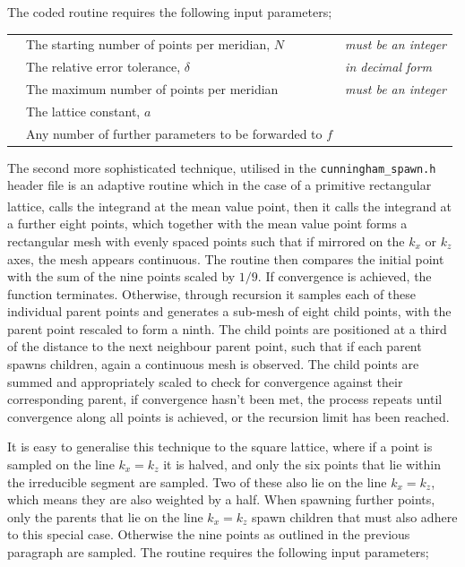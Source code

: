 \documentclass[a4paper, 12pt]{article}
\newcommand{\site}[1]{\textsuperscript{\textcolor{blue}{\cite{#1}}}}
\begin{document}
The coded routine requires the following input parameters;
\\
\begin{listliketab}
	\begin{tabular}{lll}
	\textbullet &The starting number of points per meridian, $N$ &{\it must be an integer}\\
	\textbullet &The relative error tolerance, $\delta$ &{\it in decimal form}\\
	\textbullet &The maximum number of points per meridian &{\it must be an integer}\\
	\textbullet &The lattice constant, $a$ & \\
	\textbullet &Any number of further parameters to be forwarded to $f$&\\
	\end{tabular}
\end{listliketab}
\par
The second more sophisticated technique, utilised in the {\tt cunningham\_spawn.h} header file is an adaptive routine which in the case of a primitive rectangular lattice, calls the integrand at the mean value point\site{CP}, then it calls the integrand at a further eight points, which together with the mean value point forms a rectangular mesh with evenly spaced points such that if mirrored on the $k_x$ or $k_z$ axes, the mesh appears continuous. The routine then compares the initial point with the sum of the nine points scaled by $1/9$. If convergence is achieved, the function terminates. Otherwise, through recursion it samples each of these individual parent points and generates a sub-mesh of eight child points, with the parent point rescaled to form a ninth. The child points are positioned at a third of the distance to the next neighbour parent point, such that if each parent spawns children, again a continuous mesh is observed. The child points are summed and appropriately scaled to check for convergence against their corresponding parent, if convergence hasn't been met, the process repeats until convergence along all points is achieved, or the recursion limit has been reached.
\\[2mm]\par It is easy to generalise this technique to the square lattice, where if a point is sampled on the line $k_x = k_z$ it is halved, and only the six points that lie within the irreducible segment are sampled. Two of these also lie on the line $k_x = k_z$, which means they are also weighted by a half. When spawning further points, only the parents that lie on the line $k_x = k_z$ spawn children that must also adhere to this special case. Otherwise the nine points as outlined in the previous paragraph are sampled.
The routine requires the following input parameters;
\end{document}
